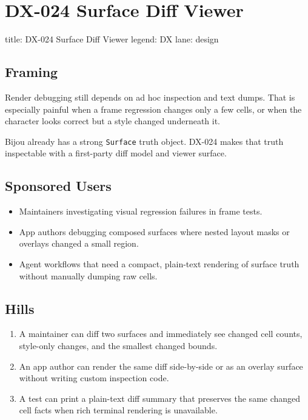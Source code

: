 \chapter{DX-024 Surface Diff Viewer}\label{record-124}

\smallskip

\begin{RecordMeta}
title: DX-024 Surface Diff Viewer
legend: DX
lane: design

\end{RecordMeta}

\section{Framing}\label{record-124-framing}

Render debugging still depends on ad hoc inspection and text dumps. That is especially painful when a frame regression changes only a few cells, or when the character looks correct but a style changed underneath it.

Bijou already has a strong \texttt{S\allowbreak{}u\allowbreak{}r\allowbreak{}f\allowbreak{}a\allowbreak{}c\allowbreak{}e} truth object. DX-024 makes that truth inspectable with a first-party diff model and viewer surface.

\section{Sponsored Users}\label{record-124-sponsored-users}

\begin{itemize}
\tightlist
\item
  Maintainers investigating visual regression failures in frame tests.
\item
  App authors debugging composed surfaces where nested layout masks or overlays changed a small region.
\item
  Agent workflows that need a compact, plain-text rendering of surface truth without manually dumping raw cells.
\end{itemize}

\section{Hills}\label{record-124-hills}

\begin{enumerate}
\def\labelenumi{\arabic{enumi}.}
\tightlist
\item
  A maintainer can diff two surfaces and immediately see changed cell counts, style-only changes, and the smallest changed bounds.
\item
  An app author can render the same diff side-by-side or as an overlay surface without writing custom inspection code.
\item
  A test can print a plain-text diff summary that preserves the same changed cell facts when rich terminal rendering is unavailable.
\end{enumerate}

